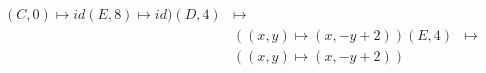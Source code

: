 \documentclass[preview]{standalone}
\begin{document}
\begin{align*}
(C,0) \mapsto id (E,8) \mapsto id) (D,4) &\mapsto \\&( (x,y) \mapsto (x, -y + 2)) (E,4) &\mapsto \\&( (x,y) \mapsto (x, -y + 2))
\end{align*}
\end{document}
